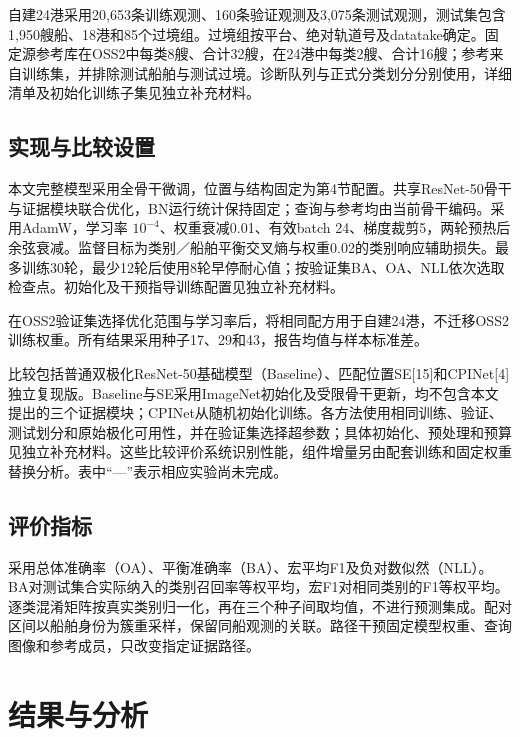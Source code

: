 \documentclass[journal,10pt,a4paper]{IEEEtran}
\begin{document}
自建24港采用20,653条训练观测、160条验证观测及3,075条测试观测，测试集包含1,950艘船、18港和85个过境组。过境组按平台、绝对轨道号及datatake确定。固定源参考库在OSS2中每类8艘、合计32艘，在24港中每类2艘、合计16艘；参考来自训练集，并排除测试船舶与测试过境。诊断队列与正式分类划分分别使用，详细清单及初始化训练子集见独立补充材料。

\subsection{实现与比较设置}\label{ux5b9eux73b0ux4e0eux6bd4ux8f83ux8bbeux7f6e}

本文完整模型采用全骨干微调，位置与结构固定为第4节配置。共享ResNet-50骨干与证据模块联合优化，BN运行统计保持固定；查询与参考均由当前骨干编码。采用AdamW，学习率 \(10^{-4}\)、权重衰减0.01、有效batch 24、梯度裁剪5，两轮预热后余弦衰减。监督目标为类别／船舶平衡交叉熵与权重0.02的类别响应辅助损失。最多训练30轮，最少12轮后使用8轮早停耐心值；按验证集BA、OA、NLL依次选取检查点。初始化及干预指导训练配置见独立补充材料。

在OSS2验证集选择优化范围与学习率后，将相同配方用于自建24港，不迁移OSS2训练权重。所有结果采用种子17、29和43，报告均值与样本标准差。

比较包括普通双极化ResNet-50基础模型（Baseline）、匹配位置SE{[}15{]}和CPINet{[}4{]}独立复现版。Baseline与SE采用ImageNet初始化及受限骨干更新，均不包含本文提出的三个证据模块；CPINet从随机初始化训练。各方法使用相同训练、验证、测试划分和原始极化可用性，并在验证集选择超参数；具体初始化、预处理和预算见独立补充材料。这些比较评价系统识别性能，组件增量另由配套训练和固定权重替换分析。表中``---''表示相应实验尚未完成。

\subsection{评价指标}\label{ux8bc4ux4ef7ux6307ux6807}

采用总体准确率（OA）、平衡准确率（BA）、宏平均F1及负对数似然（NLL）。BA对测试集合实际纳入的类别召回率等权平均，宏F1对相同类别的F1等权平均。逐类混淆矩阵按真实类别归一化，再在三个种子间取均值，不进行预测集成。配对区间以船舶身份为簇重采样，保留同船观测的关联。路径干预固定模型权重、查询图像和参考成员，只改变指定证据路径。

\FloatBarrier

\section{结果与分析}\label{ux7ed3ux679cux4e0eux5206ux6790}
\end{document}
